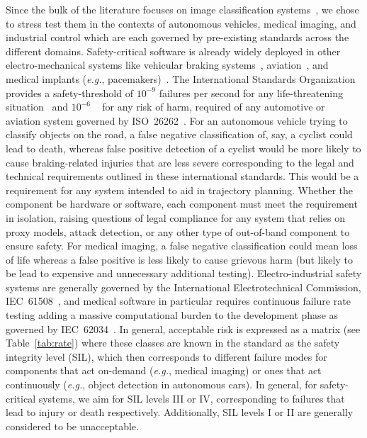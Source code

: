 \documentclass[lettersize,journal]{IEEEtran}
\newcommand{\eg}{\textit{e.g.}\xspace}
\begin{document}
Since the bulk of the literature focuses on image classification systems~\cite{dohmatob_generalized_2019, biggio_evasion_2013-1, bect_bayesian_2017, chakraborty_adversarial_2018, carlini_towards_2017, croce_reliable_2020}, we chose to stress test them in the contexts of autonomous vehicles, medical imaging, and industrial control which are each governed by pre-existing standards across the different domains. Safety-critical software is already widely deployed in other electro-mechanical systems like vehicular braking systems~\cite{braking}, aviation~\cite{aviation}, and medical implants (\eg, pacemakers)~\cite{tuan2010modeling}. The International Standards Organization provides a safety-threshold of $10^{-9}$ failures per second for any life-threatening situation~\cite{iso26262} and $10^{-6}$ ~\cite{iso26262} for any risk of harm, required of any automotive or aviation system governed by ISO~26262~\cite{iso26262}. For an autonomous vehicle trying to classify objects on the road, a false negative classification of, say, a cyclist could lead to death, whereas false positive detection of a cyclist would be more likely to cause braking-related injuries that are less severe corresponding to the legal and technical requirements outlined in these international standards. This would be a requirement for any system intended to aid in trajectory planning. Whether the component be hardware or software, each component must meet the requirement in isolation, raising questions of legal compliance for any system that relies on proxy models, attack detection, or any other type of out-of-band component to ensure safety. For medical imaging, a false negative classification could mean loss of life whereas a false positive is less likely to cause grievous harm (but likely to be lead to expensive and unnecessary additional testing).  Electro-industrial safety systems are generally governed by the International Electrotechnical Commission, IEC~61508~\cite{IEC61508}, and medical software in particular requires continuous failure rate testing adding a massive computational burden to the development phase as governed by IEC~62034~\cite{IEC62034}. In general, acceptable risk is expressed as a matrix (see Table~\ref{tab:rate}) where these classes are known in the standard as the safety integrity level (SIL), which then corresponds to different failure modes for components that act on-demand (\eg, medical imaging) or ones that act continuously (\eg, object detection in autonomous cars). In general, for safety-critical systems, we aim for SIL levels III or IV, corresponding to failures that lead to injury or death respectively. Additionally, SIL levels I or II are generally considered to be unacceptable. 
\end{document}
